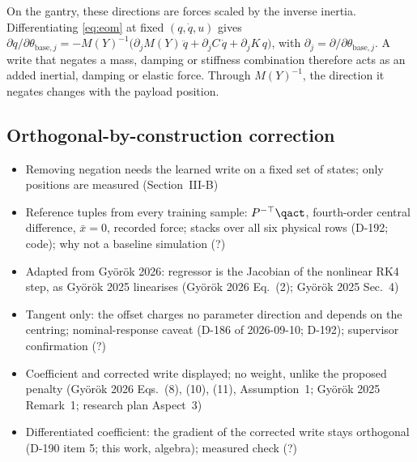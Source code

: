 On the gantry, these directions are forces scaled by the inverse inertia.
Differentiating \eqref{eq:eom} at fixed $(q,\dot q,u)$ gives
$\partial\ddot q/\partial\theta_{\mathrm{base},j}
=-M(Y)^{-1}\bigl(\partial_jM(Y)\,\ddot q+\partial_jC\,\dot q+\partial_jK\,q\bigr)$,
with $\partial_j=\partial/\partial\theta_{\mathrm{base},j}$.
A write that negates a mass, damping or stiffness combination therefore acts as
an added inertial, damping or elastic force.
Through $M(Y)^{-1}$, the direction it negates changes with the payload
position.

\subsection{Orthogonal-by-construction correction}\label{sec:obc_map}
\ifdraft
\begin{itemize}
\item Removing negation needs the learned write on a fixed set of states; only positions are measured (Section~III-B)
\item Reference tuples from every training sample: $P^{-\top}\qact$, fourth-order central difference, $\bar x=0$, recorded force; stacks over all six physical rows (D-192; code); why not a baseline simulation (?)
\item Adapted from Gy\"or\"ok 2026: regressor is the Jacobian of the nonlinear RK4 step, as Gy\"or\"ok 2025 linearises (Gy\"or\"ok 2026 Eq.~(2); Gy\"or\"ok 2025 Sec.~4)
\item Tangent only: the offset charges no parameter direction and depends on the centring; nominal-response caveat (D-186 of 2026-09-10; D-192); supervisor confirmation (?)
\item Coefficient and corrected write displayed; no weight, unlike the proposed penalty (Gy\"or\"ok 2026 Eqs.~(8), (10), (11), Assumption~1; Gy\"or\"ok 2025 Remark~1; research plan Aspect~3)
\item Differentiated coefficient: the gradient of the corrected write stays orthogonal (D-190 item 5; this work, algebra); measured check (?)
\end{itemize}
\fi

